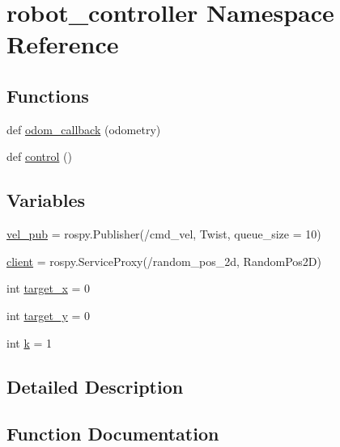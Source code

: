 \hypertarget{namespacerobot__controller}{}\section{robot\+\_\+controller Namespace Reference}
\label{namespacerobot__controller}
\subsection*{Functions}
\begin{DoxyCompactItemize}
\item 
def \hyperlink{namespacerobot__controller_acf806cd6684de6668604e261d4341aee}{odom\+\_\+callback} (odometry)
\item 
def \hyperlink{namespacerobot__controller_a511c31df6f9bf112ed99fb8e649db6ae}{control} ()
\end{DoxyCompactItemize}
\subsection*{Variables}
\begin{DoxyCompactItemize}
\item 
\hyperlink{namespacerobot__controller_a58edf5a58abe5dd46a8003ab9745ef60}{vel\+\_\+pub} = rospy.\+Publisher(\textquotesingle{}/cmd\+\_\+vel\textquotesingle{}, Twist, queue\+\_\+size = 10)
\item 
\hyperlink{namespacerobot__controller_a091c74e8004fd80216a8b14f8354153d}{client} = rospy.\+Service\+Proxy(\textquotesingle{}/random\+\_\+pos\+\_\+2d\textquotesingle{}, Random\+Pos2D)
\item 
int \hyperlink{namespacerobot__controller_a201e078a81ec56081b71169719afd965}{target\+\_\+x} = 0
\item 
int \hyperlink{namespacerobot__controller_a7e1908202f7344a885f0de5465274c21}{target\+\_\+y} = 0
\item 
int \hyperlink{namespacerobot__controller_aa848ff1d1e6f8078c8cc9dec8e82c028}{k} = 1
\end{DoxyCompactItemize}


\subsection{Detailed Description}
\begin{DoxyVerb}\end{DoxyVerb}
 

\subsection{Function Documentation}
\mbox{\label{namespacerobot__controller_a511c31df6f9bf112ed99fb8e649db6ae}} 
